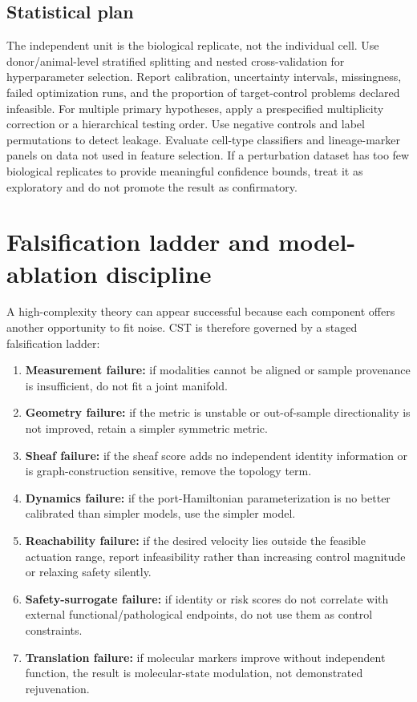 \documentclass[11pt,a4paper]{article}
\theoremstyle{definition}
\theoremstyle{remark}
\begin{document}
\subsection{Statistical plan}
The independent unit is the biological replicate, not the individual cell. Use donor/animal-level stratified splitting and nested cross-validation for hyperparameter selection. Report calibration, uncertainty intervals, missingness, failed optimization runs, and the proportion of target-control problems declared infeasible. For multiple primary hypotheses, apply a prespecified multiplicity correction or a hierarchical testing order. Use negative controls and label permutations to detect leakage. Evaluate cell-type classifiers and lineage-marker panels on data not used in feature selection. If a perturbation dataset has too few biological replicates to provide meaningful confidence bounds, treat it as exploratory and do not promote the result as confirmatory.

\section{Falsification ladder and model-ablation discipline}
A high-complexity theory can appear successful because each component offers another opportunity to fit noise. CST is therefore governed by a staged falsification ladder:
\begin{enumerate}
\item \textbf{Measurement failure:} if modalities cannot be aligned or sample provenance is insufficient, do not fit a joint manifold.
\item \textbf{Geometry failure:} if the metric is unstable or out-of-sample directionality is not improved, retain a simpler symmetric metric.
\item \textbf{Sheaf failure:} if the sheaf score adds no independent identity information or is graph-construction sensitive, remove the topology term.
\item \textbf{Dynamics failure:} if the port-Hamiltonian parameterization is no better calibrated than simpler models, use the simpler model.
\item \textbf{Reachability failure:} if the desired velocity lies outside the feasible actuation range, report infeasibility rather than increasing control magnitude or relaxing safety silently.
\item \textbf{Safety-surrogate failure:} if identity or risk scores do not correlate with external functional/pathological endpoints, do not use them as control constraints.
\item \textbf{Translation failure:} if molecular markers improve without independent function, the result is molecular-state modulation, not demonstrated rejuvenation.
\end{enumerate}
\end{document}
